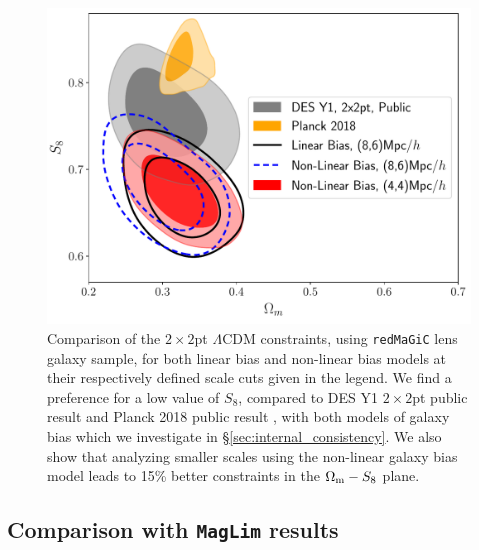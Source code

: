 \documentclass[aps, prd,twocolumn,superscriptaddress,nofootinbib,preprintnumbers]{revtex4-1}
\newcommand{\redmagic}{\texttt{redMaGiC} }
\newcommand{\maglim}{\texttt{MagLim} }
\newcommand{\blue}[1]{\textcolor{blue}{#1}}
\begin{document}
\begin{figure}
\includegraphics[width=\columnwidth]{figs/data_lcdm_comp.pdf}
\caption[]{Comparison of the $2\times2$pt $\Lambda$CDM constraints, using \redmagic lens galaxy sample, for both linear bias and non-linear bias models at their respectively defined scale cuts given in the legend. We find a preference for a low value of $S_8$, compared to DES Y1 $2\times2$pt public result \citep{Abbott_2018} and Planck 2018 public result \citep{Planck_2018_cosmo}, with both models of galaxy bias which we investigate in \S\ref{sec:internal_consistency}. We also show that analyzing smaller scales using the non-linear galaxy bias model leads to 15\% better constraints in the $\Omega_{\rm m} - S_8$ plane. }\label{fig:des_comp}
\end{figure}

\subsection{Comparison with \maglim results}
\end{document}
